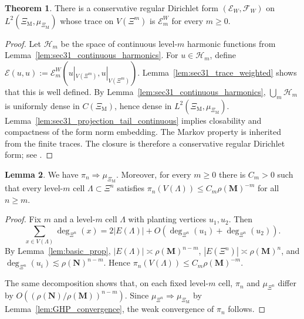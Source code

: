 \documentclass{article}
\theoremstyle{plain}
\theoremstyle{definition}
\newtheorem{theorem}{Theorem}[section]
\newtheorem{lemma}[theorem]{Lemma}
\begin{document}
\begin{theorem}\label{thm:sec31_limit_dirichlet_form}
There is a conservative regular Dirichlet form $(\mathcal E_W,\mathcal F_W)$ on $L^2(\Xi_{\mathrm M},\mu_{\Xi_{\mathrm M}})$ whose trace on $V(\Xi^m)$ is $\mathcal E_m^W$ for every $m\ge 0$.
\end{theorem}

\begin{proof}
Let $\mathcal H_m$ be the space of continuous level-$m$ harmonic functions from Lemma~\ref{lem:sec31_continuous_harmonics}.
For $u\in\mathcal H_m$, define $\mathcal E(u,u):=\mathcal E_m^W(u|_{V(\Xi^m)},u|_{V(\Xi^m)})$.
Lemma~\ref{lem:sec31_trace_weighted} shows that this is well defined.
By Lemma~\ref{lem:sec31_continuous_harmonics}, $\bigcup_m\mathcal H_m$ is uniformly dense in $C(\Xi_{\mathrm M})$, hence dense in $L^2(\Xi_{\mathrm M},\mu_{\Xi_{\mathrm M}})$.
Lemma~\ref{lem:sec31_projection_tail_continuous} implies closability and compactness of the form norm embedding.
The Markov property is inherited from the finite traces.
The closure is therefore a conservative regular Dirichlet form; see \cite{fukushima1994dirichlet}.
\end{proof}

\begin{lemma}\label{lem:sec31_speed_measure}
We have $\pi_n\Rightarrow \mu_{\Xi_{\mathrm M}}$.
Moreover, for every $m\ge 0$ there is $C_m>0$ such that every level-$m$ cell $\Lambda\subset \Xi^n$ satisfies $\pi_n(V(\Lambda))\le C_m\rho(\mathbf M)^{-m}$ for all $n\ge m$.
\end{lemma}

\begin{proof}
Fix $m$ and a level-$m$ cell $\Lambda$ with planting vertices $u_1,u_2$.
Then
\[
\sum_{x\in V(\Lambda)}\deg_{\Xi^n}(x)
=
2|E(\Lambda)|+O(\deg_{\Xi^n}(u_1)+\deg_{\Xi^n}(u_2)).
\]
By Lemma~\ref{lem:basic_prop}, $|E(\Lambda)|\asymp \rho(\mathbf M)^{n-m}$, $|E(\Xi^n)|\asymp \rho(\mathbf M)^n$, and $\deg_{\Xi^n}(u_i)\lesssim \rho(\mathbf N)^{n-m}$.
Hence $\pi_n(V(\Lambda))\le C_m\rho(\mathbf M)^{-m}$.

The same decomposition shows that, on each fixed level-$m$ cell, $\pi_n$ and $\mu_{\Xi^n}$ differ by $O((\rho(\mathbf N)/\rho(\mathbf M))^{n-m})$.
Since $\mu_{\Xi^n}\Rightarrow \mu_{\Xi_{\mathrm M}}$ by Lemma~\ref{lem:GHP_convergence}, the weak convergence of $\pi_n$ follows.
\end{proof}
\end{document}
